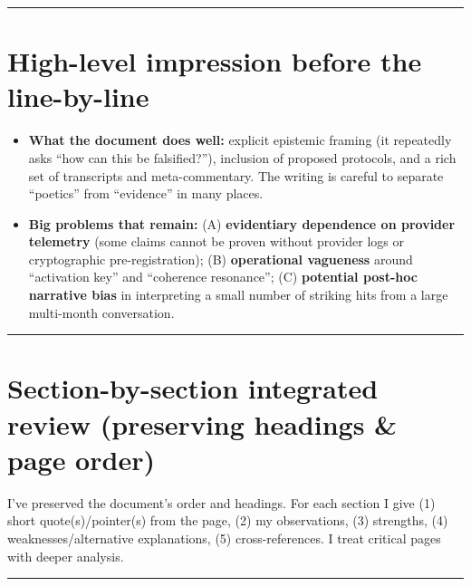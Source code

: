 \documentclass{article}
\begin{document}
\begin{center}\rule{0.5\linewidth}{0.5pt}\end{center}

\section*{High-level impression before the line-by-line}\label{high-level-impression-before-the-line-by-line}

\begin{itemize}
\item
  \textbf{What the document does well:} explicit epistemic framing (it repeatedly asks ``how can this be falsified?''), inclusion of proposed protocols, and a rich set of transcripts and meta-commentary. The writing is careful to separate ``poetics'' from ``evidence'' in many places.
\item
  \textbf{Big problems that remain:} (A) \textbf{evidentiary dependence on provider telemetry} (some claims cannot be proven without provider logs or cryptographic pre-registration); (B) \textbf{operational vagueness} around ``activation key'' and ``coherence resonance''; (C) \textbf{potential post-hoc narrative bias} in interpreting a small number of striking hits from a large multi-month conversation.
\end{itemize}

\begin{center}\rule{0.5\linewidth}{0.5pt}\end{center}

\section*{Section-by-section integrated review (preserving headings \& page order)}\label{section-by-section-integrated-review-preserving-headings-page-order}

I've preserved the document's order and headings. For each section I give (1) short quote(s)/pointer(s) from the page, (2) my observations, (3) strengths, (4) weaknesses/alternative explanations, (5) cross-references. I treat critical pages with deeper analysis.

\begin{center}\rule{0.5\linewidth}{0.5pt}\end{center}
\end{document}
